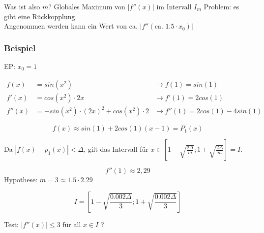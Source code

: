 Was ist also $m$? Globales Maximum von $|f''(x)|$ im Intervall $I_m$
Problem: es gibt eine Rückkopplung. \\
Angenommen werden kann ein Wert von ca. $|f''(\text{ca. } 1.5 \cdot x_0)|$


\subsubsection{Beispiel}
	EP: $x_0 = 1$
	
\begin{align*}
	f(x) &= sin(x^2) &\rightarrow f(1) = sin(1) \\
	f'(x) &= cos(x^2) \cdot 2x &\rightarrow f'(1) = 2 cos(1) \\
	f''(x) &= -sin(x^2) \cdot (2x)^2 + cos(x^2) \cdot 2 &\rightarrow f''(1) = 2 cos(1) - 4 sin(1)
\end{align*}

\[
	f(x) \approx sin(1) + 2 cos(1) (x-1) = P_1(x) 
\]

Da $|f(x) - p_1(x)| < \Delta$, gilt das Intervall für $x \in \left[1-\sqrt{\frac{2 \Delta}{m}}; 1+\sqrt{\frac{2 \Delta}{m}} \right] = I$.

\[
	f''(1) \approx 2,29
\]
Hypothese: $m=3 \approx 1.5 \cdot 2.29$

\[
	I = \left[1-\sqrt{\frac{0.002 \Delta}{3}}; 1+\sqrt{\frac{0.002 \Delta}{3}} \right]
\]

Test: $|f''(x)| \leq 3$ für all $x \in I$ ?


